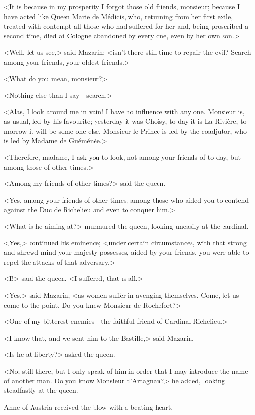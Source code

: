 <It is because in my prosperity I forgot those old friends, monsieur; because I have acted like Queen Marie de Médicis, who, returning from her first exile, treated with contempt all those who had suffered for her and, being proscribed a second time, died at Cologne abandoned by every one, even by her own son.>

<Well, let us see,> said Mazarin; <isn't there still time to repair the evil? Search among your friends, your oldest friends.>

<What do you mean, monsieur?>

<Nothing else than I say—search.>

<Alas, I look around me in vain! I have no influence with any one. Monsieur is, as usual, led by his favourite; yesterday it was Choisy, to-day it is La Rivière, to-morrow it will be some one else. Monsieur le Prince is led by the coadjutor, who is led by Madame de Guéménée.>

<Therefore, madame, I ask you to look, not among your friends of to-day, but among those of other times.>

<Among my friends of other times?> said the queen.

<Yes, among your friends of other times; among those who aided you to contend against the Duc de Richelieu and even to conquer him.>

<What is he aiming at?> murmured the queen, looking uneasily at the cardinal.

<Yes,> continued his eminence; <under certain circumstances, with that strong and shrewd mind your majesty possesses, aided by your friends, you were able to repel the attacks of that adversary.>

<I\@!> said the queen. <I suffered, that is all.>

<Yes,> said Mazarin, <as women suffer in avenging themselves. Come, let us come to the point. Do you know Monsieur de Rochefort?>

<One of my bitterest enemies—the faithful friend of Cardinal Richelieu.>

<I know that, and we sent him to the Bastille,> said Mazarin.

<Is he at liberty?> asked the queen.

<No; still there, but I only speak of him in order that I may introduce the name of another man. Do you know Monsieur d'Artagnan?> he added, looking steadfastly at the queen.

Anne of Austria received the blow with a beating heart.

